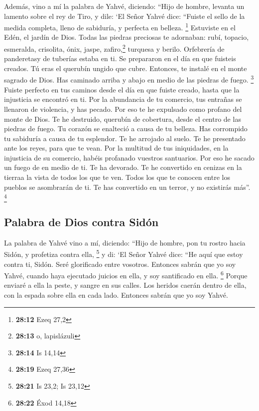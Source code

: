 \begin{paracol}{2}
 Además, vino a mí la palabra de Yahvé, diciendo:
 ``Hijo de hombre, levanta un lamento sobre el rey de
Tiro, y dile: `El Señor Yahvé dice: ``Fuiste el sello de la medida
completa, lleno de sabiduría, y perfecta en belleza. \footnote{\textbf{28:12}
  Ezeq 27,2}  Estuviste en el Edén, el jardín de Dios.
Todas las piedras preciosas te adornaban: rubí, topacio, esmeralda,
crisolita, ónix, jaspe, zafiro,\footnote{\textbf{28:13} o, lapislázuli}
turquesa y berilo. Orfebrería de panderetasy de tuberías estaba en ti.
Se prepararon en el día en que fuisteis creados.  Tú eras
el querubín ungido que cubre. Entonces, te instalé en el monte sagrado
de Dios. Has caminado arriba y abajo en medio de las piedras de fuego.
\footnote{\textbf{28:14} Is 14,14}  Fuiste perfecto en
tus caminos desde el día en que fuiste creado, hasta que la injusticia
se encontró en ti.  Por la abundancia de tu comercio, tus
entrañas se llenaron de violencia, y has pecado. Por eso te he expulsado
como profano del monte de Dios. Te he destruido, querubín de cobertura,
desde el centro de las piedras de fuego.  Tu corazón se
enalteció a causa de tu belleza. Has corrompido tu sabiduría a causa de
tu esplendor. Te he arrojado al suelo. Te he presentado ante los reyes,
para que te vean.  Por la multitud de tus iniquidades, en
la injusticia de su comercio, habéis profanado vuestros santuarios. Por
eso he sacado un fuego de en medio de ti. Te ha devorado. Te he
convertido en cenizas en la tierraa la vista de todos los que te ven.
 Todos los que te conocen entre los pueblos se asombrarán
de ti. Te has convertido en un terror, y no existirás más''. \footnote{\textbf{28:19}
  Ezeq 27,36}

\hypertarget{palabra-de-dios-contra-siduxf3n}{%
\subsection{Palabra de Dios contra
Sidón}\label{palabra-de-dios-contra-siduxf3n}}

 La palabra de Yahvé vino a mí, diciendo: 
``Hijo de hombre, pon tu rostro hacia Sidón, y profetiza contra ella,
\footnote{\textbf{28:21} Is 23,2; Is 23,12}  y di: `El
Señor Yahvé dice: ``He aquí que estoy contra ti, Sidón. Seré glorificado
entre vosotros. Entonces sabrán que yo soy Yahvé, cuando haya ejecutado
juicios en ella, y soy santificado en ella. \footnote{\textbf{28:22}
  Éxod 14,18}  Porque enviaré a ella la peste, y sangre
en sus calles. Los heridos caerán dentro de ella, con la espada sobre
ella en cada lado. Entonces sabrán que yo soy Yahvé.


\end{paracol}

